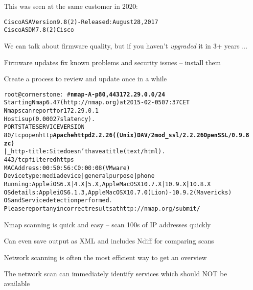 \documentclass[Screen16to9,17pt]{foils}
\begin{document}


This was seen at the same customer in 2020:
\begin{alltt}
Cisco ASA Version 9.8(2) - Released: August 28, 2017
Cisco ASDM 7.8(2)Cisco
\end{alltt}

\begin{list2}
\item We can talk about firmware quality, but if you haven't \emph{upgraded} it in 3+ years ...
\item Firmware updates fix known problems and security issues -- install them
\item Create a process to review and update once in a while
\end{list2}


\begin{alltt}\scriptsize
root@cornerstone:~#{\bfseries nmap -A -p80,443 172.29.0.0/24}
Starting Nmap 6.47 ( http://nmap.org ) at 2015-02-05 07:37 CET
Nmap scan report for 172.29.0.1
Host is up (0.00027s latency).
PORT    STATE    SERVICE VERSION
80/tcp  open     http    {\bf Apache httpd 2.2.26 ((Unix) DAV/2 mod_ssl/2.2.26 OpenSSL/0.9.8zc)}
|_http-title: Site doesn't have a title (text/html).
443/tcp filtered https
MAC Address: 00:50:56:C0:00:08 (VMware)
Device type: media device|general purpose|phone
Running: Apple iOS 6.X|4.X|5.X, Apple Mac OS X 10.7.X|10.9.X|10.8.X
OS details: Apple iOS 6.1.3, Apple Mac OS X 10.7.0 (Lion) - 10.9.2 (Mavericks)
OS and Service detection performed.
Please report any incorrect results at http://nmap.org/submit/
\end{alltt}

\begin{list2}
\item Nmap scanning is quick and easy -- scan 100s of IP addresses quickly
\item Can even save output as XML and includes Ndiff for comparing scans
\item Network scanning is often the most efficient way to get an overview
\item The network scan can immediately identify services which should NOT be available
\end{list2}


\end{document}
